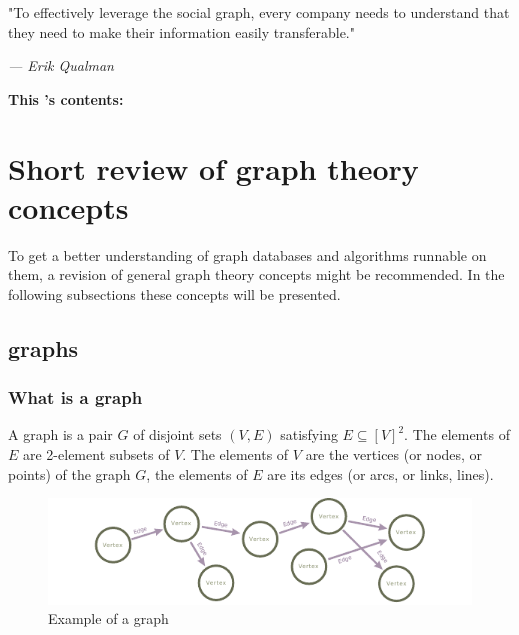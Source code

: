 \begin{figure}[H]%
		\label{fig:\chaptername\thechapter}%
\end{figure}

\vspace*{-4.1cm}
\epigraph{"To effectively leverage the social graph, every company needs to understand that they need to make their information easily transferable."}{\textit{--- Erik Qualman}}

\noindent \large{\textbf{This {\MakeLowercase{\chaptername}}'s contents:}}
\vspace*{-0.7cm}
\minitoc \mtcskip \minilof
\vspace*{-1.2cm}
\section[Short review of Graph Theory concepts]{Short review of \Gls{graph theory} concepts} \label{section:LiteratureReview/ShortreviewofGraphTheoryconcepts}
To get a better understanding of \Glspl{graph database} and algorithms runnable on them, a revision of general graph theory concepts might be recommended. In the following subsections these concepts will be presented.

\subsection[Graphs]{\Glspl{graph}} \label{subsection:LiteratureReview/ShortreviewofGraphTheoryconcepts/Graphs}

\subsubsection[What is a graph]{What is a \gls{graph}} \label{subsubsection:LiteratureReview/ShortreviewofGraphTheoryconcepts/Graphs/Whatisagraph}
\begin{definition}[of graphs]\label{definition:ofgraphs}
	A graph is a pair $ G $ of disjoint sets $ \left(V, E \right) $ satisfying $ E \subseteq \left[ V \right]^2 $.
	The elements of $ E $ are 2-element subsets of $ V $.
	The elements of $ V $ are the vertices (or nodes, or points) of the graph $ G $, the elements of $ E $ are its edges (or arcs, or links, lines).
\end{definition}
\begin{figure}[H]%
	\centering%
	\includegraphics[width=1\textwidth]{images/chapter2/ExampleGraphnew.pdf}%
	\caption[Example of a graph]{Example of a graph}%
	\label{fig:ExampleGraphnew}%
\end{figure}%

